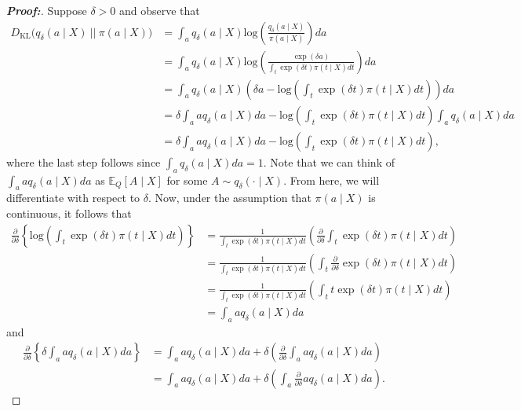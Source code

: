 \documentclass[11pt,twoside]{article}
\theoremstyle{definition}
\theoremstyle{remark}
\begin{document}
\begin{proof}[\textbf{Proof:}]
    Suppose $\delta > 0$ and observe that
    \begin{align*}
        D_{\text{KL}}\Big(q_\delta(a \mid X) \: || \: \pi(a \mid X) \Big) &= \int_a q_\delta(a \mid X) \text{log}\left(\frac{q_\delta(a \mid X)}{\pi(a \mid X)} \right) da \\
        &= \int_a q_\delta(a \mid X) \text{log}\left(\frac{\exp(\delta a)}{\int_t \exp( \delta t) \pi(t \mid X) dt}  \right) da \\
        &= \int_a q_\delta(a \mid X) \left( \delta a - \text{log}\left(\int_t \exp( \delta t) \pi(t \mid X) dt \right)  \right) da \\
        &= \delta \int_a a q_\delta(a \mid X)da -  \text{log}\left(\int_t \exp( \delta t) \pi(t \mid X) dt \right) \int_a q_\delta(a \mid X) da \\
        &= \delta \int_a a q_\delta(a \mid X)da -  \text{log}\left(\int_t \exp( \delta t) \pi(t \mid X) dt \right),
    \end{align*}
    where the last step follows since $\int_a q_\delta(a \mid X) da = 1$. Note that we can think of $\int_a a q_\delta(a \mid X)da$ as $\mathbb{E}_Q[A \mid X]$ for some $A \sim q_{\delta}( \cdot \mid X)$. From here, we will differentiate with respect to $\delta$. Now, under the assumption that $\pi(a \mid X)$ is continuous, it follows that
    \begin{align*}
        \frac{\partial }{\partial \delta} \left\{ \text{log}\left(\int_t \exp(\delta t) \pi(t \mid X) dt \right) \right\} &= \frac{1}{\int_t \exp(\delta t) \pi(t \mid X) dt}\left( \frac{\partial }{\partial \delta} \int_t \exp(\delta t) \pi(t \mid X) dt\right) \\
        &= \frac{1}{\int_t \exp(\delta t) \pi(t \mid X) dt}\left(  \int_t \frac{\partial }{\partial \delta}  \exp(\delta t) \pi(t \mid X) dt \right) \\
        &= \frac{1}{\int_t \exp(\delta t) \pi(t \mid X) dt} \left(\int_t t \exp(\delta t) \pi(t \mid X) dt \right) \\
        &= \int_a a q_\delta(a \mid X)  da
    \end{align*}
    and
    \begin{align*}
        \frac{\partial}{\partial \delta} \left\{ \delta \int_a a q_\delta(a \mid X)da \right\} &= \int_a a q_\delta(a \mid X)da + \delta \left( \frac{\partial}{\partial \delta} \int_a a q_\delta(a \mid X)da \right) \\
        &= \int_a a q_\delta(a \mid X)da + \delta \left(  \int_a \frac{\partial}{\partial \delta} a q_\delta(a \mid X)da \right). 

\end{align*}
\end{proof}
\end{document}
